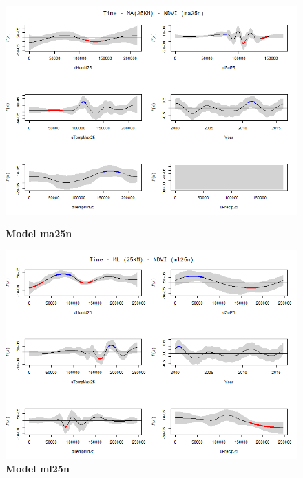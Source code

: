 \chapter{}

\begin{figure}[H]
 \centering
    \begin{minipage}{0.8\textwidth}
        \centering
        \includegraphics[width=1\textwidth]{ma25n.png} %
        \caption{\textbf{Model ma25n}}
    \end{minipage}\hfill
    \begin{minipage}{0.8\textwidth}
        \centering
        \includegraphics[width=1\textwidth]{ml25n.png} %
        \caption{\textbf{Model ml25n}}
    \end{minipage}
\end{figure}


